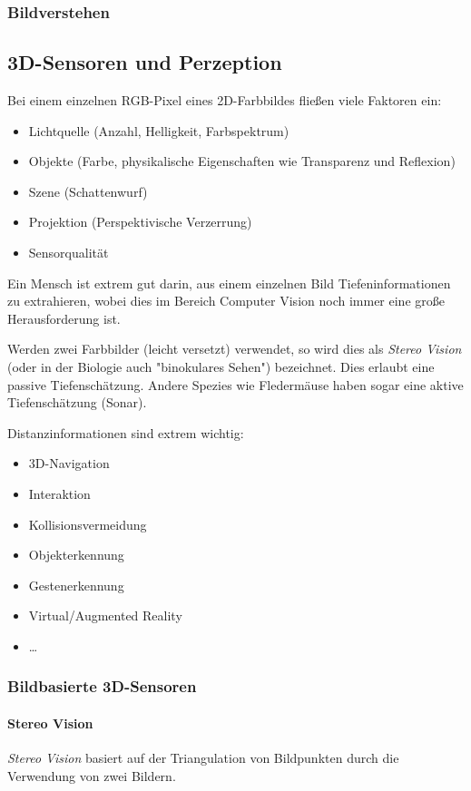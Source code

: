 			\subsubsection{Bildverstehen} %

		\subsection{3D-Sensoren und Perzeption}
			Bei einem einzelnen RGB-Pixel eines 2D-Farbbildes fließen viele Faktoren ein:
			\begin{itemize}
				\item Lichtquelle (Anzahl, Helligkeit, Farbspektrum)
				\item Objekte (Farbe, physikalische Eigenschaften wie Transparenz und Reflexion)
				\item Szene (Schattenwurf)
				\item Projektion (Perspektivische Verzerrung)
				\item Sensorqualität
			\end{itemize}
			Ein Mensch ist extrem gut darin, aus einem einzelnen Bild Tiefeninformationen zu extrahieren, wobei dies im Bereich Computer Vision noch immer eine große Herausforderung ist.

			Werden zwei Farbbilder (leicht versetzt) verwendet, so wird dies als \emph{Stereo Vision} (oder in der Biologie auch "binokulares Sehen") bezeichnet. Dies erlaubt eine passive Tiefenschätzung. Andere Spezies wie Fledermäuse haben sogar eine aktive Tiefenschätzung (Sonar).

			Distanzinformationen sind extrem wichtig:
			\begin{itemize}
				\item 3D-Navigation
				\item Interaktion
				\item Kollisionsvermeidung
				\item Objekterkennung
				\item Gestenerkennung
				\item Virtual/Augmented Reality
				\item \dots
			\end{itemize}

			\subsubsection{Bildbasierte 3D-Sensoren}
				\paragraph{Stereo Vision}
					\emph{Stereo Vision} basiert auf der Triangulation von Bildpunkten durch die Verwendung von zwei Bildern.

